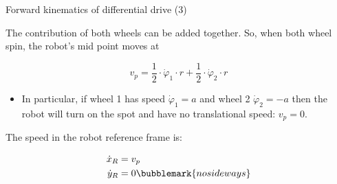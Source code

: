 \documentclass[compress]{beamer}
\begin{document}
\begin{frame}{Forward kinematics of differential drive (3)}

    The contribution of both wheels can be added together. So, when both
    wheel spin, the robot's mid point moves at

    \[
    v_p = \frac{1}{2}\cdot \dot\varphi_1\cdot r + \frac{1}{2}\cdot \dot\varphi_2\cdot r
    \]


            \begin{itemize}
                \item In particular, if wheel 1 has speed $\dot\varphi_1 = a$ and wheel 2 $\dot\varphi_2 = -a$ then the robot will turn
                    on the spot and have no translational speed: $v_p = 0$.
            \end{itemize}

    \pause

    The speed in the robot reference frame is:

    \begin{align*}
        \dot{x}_R &= v_p \\
        \dot{y}_R &= 0\bubblemark{nosideways}
    \end{align*}


\end{frame}
\end{document}
